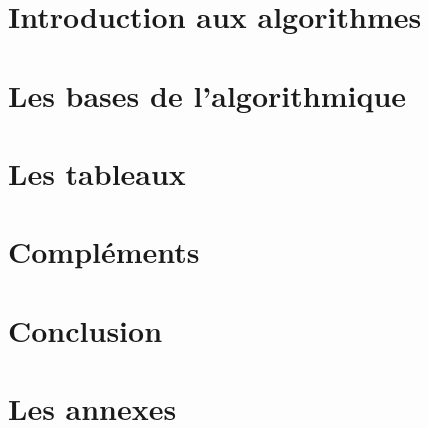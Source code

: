\documentclass[a4paper,doubleside]{book}
\begin{document}

	
	
	

	\part{Introduction aux algorithmes}	
		
		
		

	\part{Les bases de l'algorithmique}
		
		
		
		
		

	\part{Les tableaux}
		
		
		
		
			
	\part{Compléments}
		
		

	\part{Conclusion}
		

	\appendix
	
	\part{Les annexes}
		
		
		
		
	
	
\end{document}
